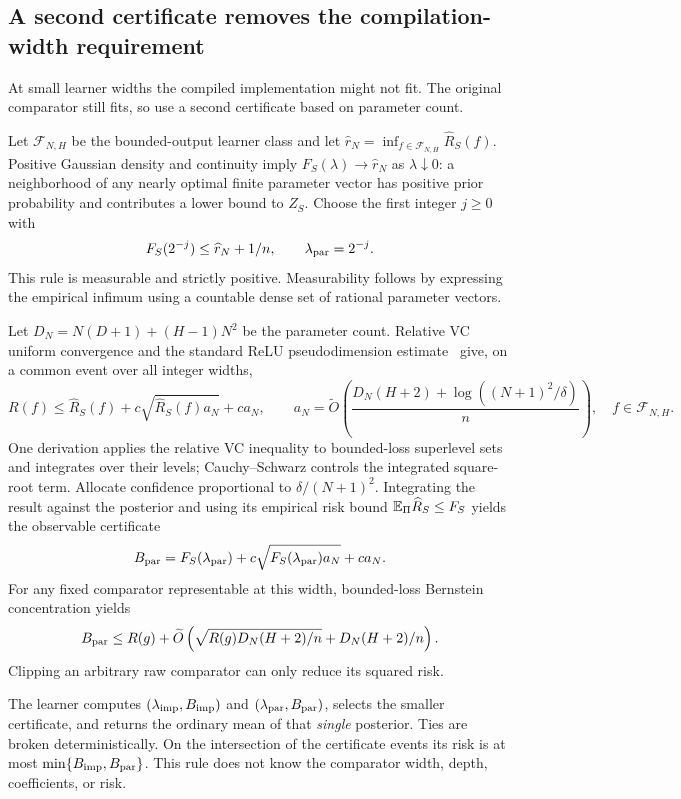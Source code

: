 \subsection{A second certificate removes the compilation-width requirement}
At small learner widths the compiled implementation might not fit. The original comparator still fits, so use a second certificate based on parameter count.

Let $\mathcal F_{N,H}$ be the bounded-output learner class and let
$\widehat r_N=\inf_{f\in\mathcal F_{N,H}}\widehat R_S(f)$.
Positive Gaussian density and continuity imply $F_S(\lambda)\to\widehat r_N$ as $\lambda\downarrow0$: a neighborhood of any nearly optimal finite parameter vector has positive prior probability and contributes a lower bound to $Z_S$. Choose the first integer $j\ge0$ with
\[
 F_S(2^{-j})\le\widehat r_N+1/n,
 \qquad \lambda_{\rm par}=2^{-j}.
\]
This rule is measurable and strictly positive. Measurability follows by expressing the empirical infimum using a countable dense set of rational parameter vectors.

Let $D_N=N(D+1)+(H-1)N^2$ be the parameter count. Relative VC uniform convergence and the standard ReLU pseudodimension estimate~\cite{vapnik,bartlettvc} give, on a common event over all integer widths,
\[
 R(f)\le\widehat R_S(f)+c\sqrt{\widehat R_S(f)a_N}+ca_N,
 \qquad a_N=\widetilde O\left(\frac{D_N(H+2)+\log((N+1)^2/\delta)}n\right),
 \quad f\in\mathcal F_{N,H}.
\]
One derivation applies the relative VC inequality to bounded-loss superlevel sets and integrates over their levels; Cauchy--Schwarz controls the integrated square-root term. Allocate confidence proportional to $\delta/(N+1)^2$. Integrating the result against the posterior and using its empirical risk bound $\mathbb E_\Pi\widehat R_S\le F_S$ yields the observable certificate
\[
 B_{\rm par}=F_S(\lambda_{\rm par})+
                c\sqrt{F_S(\lambda_{\rm par})a_N}+ca_N.
\]
For any fixed comparator representable at this width, bounded-loss Bernstein concentration yields
\begin{equation}
 B_{\rm par}\le R(g)+\widetilde O\left(
       \sqrt{R(g)D_N(H+2)/n}+D_N(H+2)/n\right).
 \label{eq:boolean-parameter-oracle}
\end{equation}
Clipping an arbitrary raw comparator can only reduce its squared risk.

The learner computes $(\lambda_{\rm imp},B_{\rm imp})$ and $(\lambda_{\rm par},B_{\rm par})$, selects the smaller certificate, and returns the ordinary mean of that \emph{single} posterior. Ties are broken deterministically. On the intersection of the certificate events its risk is at most $\min\{B_{\rm imp},B_{\rm par}\}$. This rule does not know the comparator width, depth, coefficients, or risk.

